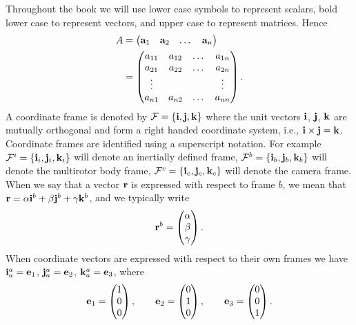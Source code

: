 Throughout the book we will use lower case symbols to represent scalars, bold lower case to represent vectors, and upper case to represent matrices. Hence
\begin{align*}
A &= \begin{pmatrix} \mathbf{a}_1 & \mathbf{a}_2 & \dots & \mathbf{a}_n\end{pmatrix} \\
  &= \begin{pmatrix} a_{11} & a_{12} & \dots & a_{1n} \\
                     a_{21} & a_{22} & \dots & a_{2n} \\
                     \vdots & & & \vdots \\
                     a_{n1} & a_{n2} & \dots & a_{nn}	
 	 \end{pmatrix}.
\end{align*}
A coordinate frame is denoted by $\mathcal{F} = \{\mathbf{i}, \mathbf{j}, \mathbf{k}\}$ where the unit vectors $\mathbf{i}$, $\mathbf{j}$, $\mathbf{k}$ are mutually orthogonal and form a right handed coordinate system, i.e., $\mathbf{i}\times\mathbf{j}=\mathbf{k}$.  Coordinate frames are identified using a superscript notation.  For example $\mathcal{F}^i=\{\mathbf{i}_i, \mathbf{j}_i, \mathbf{k}_i\}$ will denote an inertially defined frame, $\mathcal{F}^b=\{\mathbf{i}_b, \mathbf{j}_b, \mathbf{k}_b\}$ will denote the multirotor body frame, $\mathcal{F}^c=\{\mathbf{i}_c, \mathbf{j}_c, \mathbf{k}_c\}$ will denote the camera frame.  When we say that a vector $\mathbf{r}$ is expressed with respect to frame $b$, we mean that $\mathbf{r}=\alpha\mathbf{i}^b + \beta\mathbf{j}^b + \gamma\mathbf{k}^b$, and we typically write 
\[
\mathbf{r}^b = \begin{pmatrix} \alpha \\ \beta \\ \gamma \end{pmatrix}.
\]
When coordinate vectors are expressed with respect to their own frames we have $\mathbf{i}_a^a=\mathbf{e}_1$, $\mathbf{j}_a^a=\mathbf{e}_2$, $\mathbf{k}_a^a=\mathbf{e}_3$, where
\[
\mathbf{e}_1 = \begin{pmatrix}1 \\ 0 \\ 0 \end{pmatrix}, \qquad \mathbf{e}_2 = \begin{pmatrix}0 \\ 1 \\ 0 \end{pmatrix}, \qquad \mathbf{e}_3 = \begin{pmatrix}0 \\ 0 \\ 1
    \end{pmatrix}.
\]

